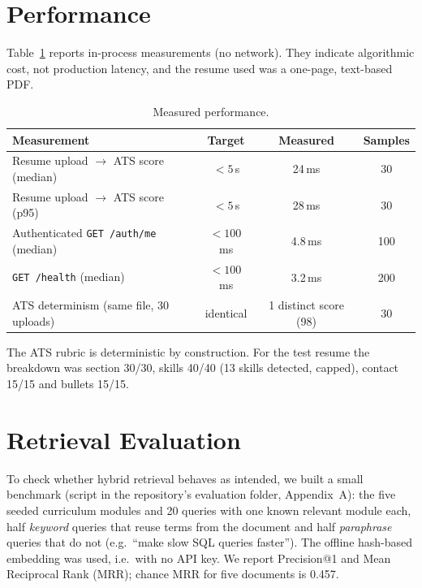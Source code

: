 \documentclass[openany]{tietreport}
\newcommand{\code}[1]{\texttt{\small #1}}
\begin{document}
\section{Performance}
Table~\ref{tab:perf} reports in-process measurements (no network). They indicate algorithmic cost, not production latency, and the resume used was a one-page, text-based PDF.

\begin{table}[h]
\centering\small
\begin{tabular}{@{}lccc@{}}
\toprule
\textbf{Measurement} & \textbf{Target} & \textbf{Measured} & \textbf{Samples} \\
\midrule
Resume upload $\rightarrow$ ATS score (median) & $<5$\,s & 24\,ms & 30 \\
Resume upload $\rightarrow$ ATS score (p95) & $<5$\,s & 28\,ms & 30 \\
Authenticated \code{GET /auth/me} (median) & $<100$\,ms & 4.8\,ms & 100 \\
\code{GET /health} (median) & $<100$\,ms & 3.2\,ms & 200 \\
ATS determinism (same file, 30 uploads) & identical & 1 distinct score (98) & 30 \\
\bottomrule
\end{tabular}
\caption{Measured performance.}
\label{tab:perf}
\end{table}

\noindent The ATS rubric is deterministic by construction. For the test resume the breakdown was section 30/30, skills 40/40 (13 skills detected, capped), contact 15/15 and bullets 15/15.

\section{Retrieval Evaluation}
\label{sec:rag}
To check whether hybrid retrieval behaves as intended, we built a small benchmark (script in the repository's evaluation folder, Appendix~A): the five seeded curriculum modules and 20 queries with one known relevant module each, half \emph{keyword} queries that reuse terms from the document and half \emph{paraphrase} queries that do not (e.g.\ ``make slow SQL queries faster''). The offline hash-based embedding was used, i.e.\ with no API key. We report Precision@1 and Mean Reciprocal Rank (MRR); chance MRR for five documents is 0.457.
\end{document}
